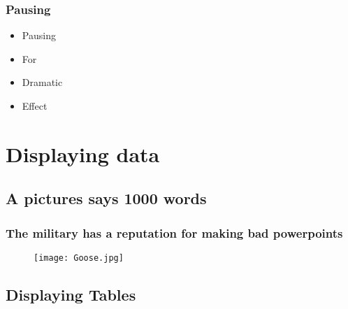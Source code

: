 \documentclass[12pt]{beamer}
\begin{document}
\begin{frame} %
\frametitle{Pausing} %
\begin{itemize} %
	\item Pausing
	\pause
	\item For
	\pause
	\item Dramatic
	\pause
	\item Effect
\end{itemize}
\end{frame} %


\section{Displaying data} 

\subsection{A pictures says 1000 words}

\begin{frame}
\frametitle{The military has a reputation for making bad powerpoints}
\begin{figure}
           \begin{center}
                     \texttt{[image: Goose.jpg]}
           \end{center}
           \label{}
\end{figure}
\end{frame}


\subsection{Displaying Tables}
\end{document}
